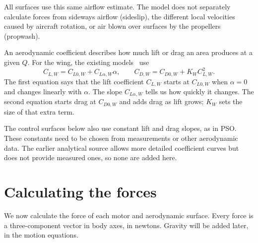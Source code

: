 \documentclass[11pt,a4paper]{article}
\numberwithin{equation}{section}
\begin{document}
All surfaces use this same airflow estimate. The model does not separately
calculate forces from sideways airflow (sideslip), the different local
velocities caused by aircraft rotation, or air blown over surfaces by the
propellers (propwash).

An aerodynamic coefficient describes how much lift or drag an area produces
at a given $Q$. For the wing, the existing models~\cite{pso,symbolic} use
\begin{equation}\label{eq:wing-coeff}
 C_{L,W}=C_{L0,W}+C_{L\alpha,W}\alpha,\qquad
 C_{D,W}=C_{D0,W}+K_W C_{L,W}^2.
\end{equation}
The first equation says that the lift coefficient $C_{L,W}$ starts at
$C_{L0,W}$ when $\alpha=0$ and changes linearly with $\alpha$.
The slope $C_{L\alpha,W}$ tells us how quickly it changes.
The second equation starts drag at $C_{D0,W}$ and adds drag as lift grows;
$K_W$ sets the size of that extra term.

The control surfaces below also use constant lift and drag slopes, as in PSO.
These constants need to be chosen from measurements or other aerodynamic
data. The earlier analytical source allows more detailed coefficient curves
but does not provide measured ones, so none are added here.

\section{Calculating the forces}
We now calculate the force of each motor and aerodynamic surface.
Every force is a three-component vector in body axes, in newtons.
Gravity will be added later, in the motion equations.
\end{document}

